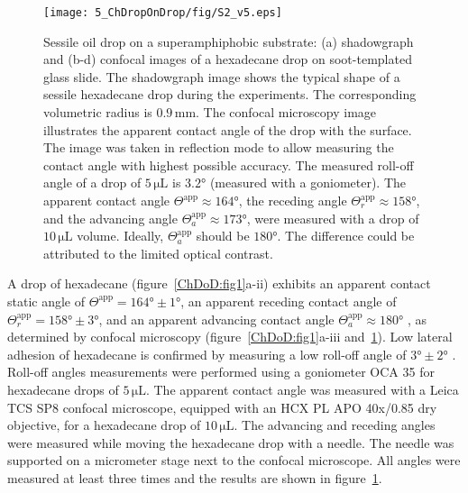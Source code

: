 \begin{subappendices}
	\begin{figure}
		\centering
		\texttt{[image: 5\_ChDropOnDrop/fig/S2\_v5.eps]}
		\caption{Sessile oil drop on a superamphiphobic substrate: (a) shadowgraph  and (b-d) confocal images of a hexadecane drop on soot-templated glass slide. The shadowgraph image shows the typical shape of a sessile hexadecane drop during the experiments. The corresponding volumetric radius is $0.9\,\si{\milli\meter}$. The confocal microscopy image illustrates the apparent contact angle of the drop with the surface. The image was taken in reflection mode to allow measuring the contact angle with highest possible accuracy. The measured roll-off angle of a drop of $5\,\si{\micro\liter}$ is $3.2\si{\degree}$ (measured with a goniometer). The apparent contact angle $\Theta^{\text{app}} \approx 164\si{\degree}$, the receding angle $\Theta_r^{\text{app}} \approx 158\si{\degree}$, and the advancing angle $\Theta_a^{\text{app}} \approx 173\si{\degree}$, were measured with a drop of $10\,\si{\micro\liter}$ volume. Ideally, $\Theta_a^{\text{app}}$ should be $180\si{\degree}$. The difference could be attributed to the limited optical contrast.}
		\label{ChDoD:figS2}
	\end{figure}

	A drop of hexadecane (figure~\ref{ChDoD:fig1}a-ii) exhibits an apparent contact static angle of $\Theta^{\text{app}} = 164\si{\degree} \pm 1\si{\degree}$, an apparent receding contact angle of $\Theta_r^{\text{app}} = 158\si{\degree} \pm 3\si{\degree}$, and an apparent advancing contact angle $\Theta_a^{\text{app}} \approx 180\si{\degree}$ \citep{schellenberger2016}, as determined by confocal microscopy (figure~\ref{ChDoD:fig1}a-iii and~\ref{ChDoD:figS2}). Low lateral adhesion of hexadecane is confirmed by measuring a low roll-off angle of $3\si{\degree} \pm 2\si{\degree}$ \cite{quere2002fakir, elsherbini2006}. Roll-off angles measurements were performed using a goniometer OCA 35 for hexadecane drops of $5\,\si{\micro\liter}$. The apparent contact angle was measured with a Leica TCS SP8 confocal microscope, equipped with an HCX PL APO 40x/0.85 dry objective, for a hexadecane drop of $10\,\si{\micro\liter}$. The advancing and receding angles were measured while moving the hexadecane drop with a needle. The needle was supported on a micrometer stage next to the confocal microscope. All angles were measured at least three times and the results are shown in figure~\ref{ChDoD:figS2}.
	

\end{subappendices}
